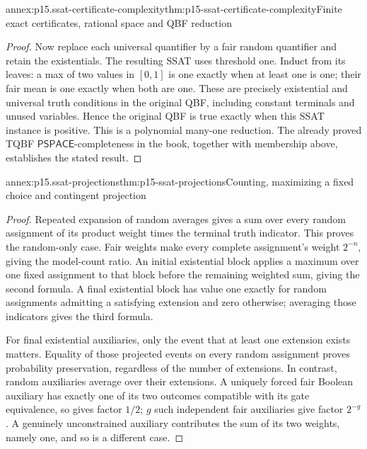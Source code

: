 \begin{annexitem}{annex:p15.ssat-certificate-complexity}{thm:p15-ssat-certificate-complexity}{Finite exact certificates, rational space and QBF reduction}
\begin{proof}
Now replace each universal quantifier by a fair random quantifier and
retain the existentials. The resulting SSAT uses threshold one.
Induct from its leaves: a max of two values in \([0,1]\) is one
exactly when at least one is one; their fair mean is one exactly when
both are one. These are precisely existential and universal truth
conditions in the original QBF, including constant terminals and
unused variables. Hence the original QBF is true exactly when this
SSAT instance is positive. This is a polynomial many-one reduction.
The already proved TQBF \(\mathsf{PSPACE}\)-completeness in the
book, together with membership above, establishes the stated result.
\end{proof}
\end{annexitem}

\begin{annexitem}{annex:p15.ssat-projections}{thm:p15-ssat-projections}{Counting, maximizing a fixed choice and contingent projection}
\begin{proof}
Repeated expansion of random averages gives a sum over every random
assignment of its product weight times the terminal truth indicator.
This proves the random-only case. Fair weights make every complete
assignment's weight \(2^{-n}\), giving the model-count ratio.
An initial existential block applies a maximum over one fixed assignment
to that block before the remaining weighted sum, giving the second
formula. A final existential block has value one exactly for random
assignments admitting a satisfying extension and zero otherwise;
averaging those indicators gives the third formula.

For final existential auxiliaries, only the event that at least one
extension exists matters. Equality of those projected events on every
random assignment proves probability preservation, regardless of the
number of extensions. In contrast, random auxiliaries average over
their extensions. A uniquely forced fair Boolean auxiliary has exactly
one of its two outcomes compatible with its gate equivalence, so gives
factor \(1/2\); \(g\) such independent fair auxiliaries give
factor \(2^{-g}\). A genuinely unconstrained auxiliary contributes
the sum of its two weights, namely one, and so is a different case.


\end{proof}
\end{annexitem}
